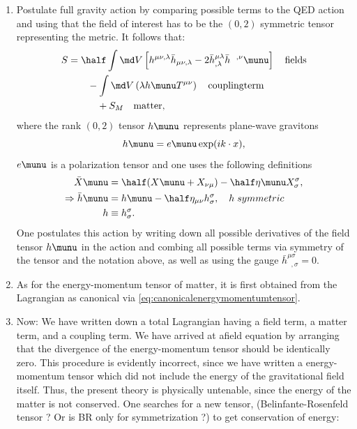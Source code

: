\begin{enumerate}
	\item Postulate full gravity action by comparing possible terms to the QED action and using that the field of interest has to be the $(0,2)$ symmetric tensor representing the metric. It follows that:
	\begin{align}
		S &= \half \int \md V\left[h^{\mu \nu, \lambda} \bar{h}_{\mu \nu, \lambda} - 2 \bar{h}^{\mu \lambda}_{,\lambda} \bar{h}^{\;\;\,,\nu}\munu \right] \quad \mathrm{fields} \nonumber \\
		& \qquad - \int \md V \left(\lambda h\munu T^{\mu \nu}\right) \quad \mathrm{coupling term} \nonumber \\
		&\qquad \quad + S_M \quad \mathrm{matter},
	\end{align}
where the rank $(0,2)$ tensor $h\munu$ represents plane-wave gravitons 
\begin{equation}
	h\munu = e\munu \exp(i k \cdot x),
\end{equation}
$e\munu$ is a polarization tensor and one uses the following definitions
\begin{align*}
	\bar{X}\munu &= \half (X\munu + X_{\nu \mu}) - \half \eta\munu X^\sigma_\sigma,\\
	\Rightarrow \bar{h}\munu &= h\munu - \half \eta_{\mu \nu} h^\sigma_\sigma, \quad h \; symmetric \\
	h&\equiv h^\sigma_\sigma.
\end{align*}
One postulates this action by writing down all possible derivatives of the field tensor $h\munu$ in the action and combing all possible terms via symmetry of the tensor and the notation above, as well as using the gauge $\bar{h}^{\mu \sigma}_{\;\; , \sigma}=0$.
\item As for the energy-momentum tensor of matter, it is first obtained from the Lagrangian as canonical via \ref{eq:canonicalenergymomentumtensor}. 
\item Now: We have written down a total Lagrangian having a field term, a matter term, and a coupling term. We have arrived at afield equation by arranging that the divergence of the energy-momentum tensor should be identically zero. This procedure is evidently incorrect, since we have written a energy-momentum tensor which did not include the energy of the gravitational field itself. Thus, the present theory is physically untenable, since the energy of the matter is not conserved. One searches for a new tensor, (Belinfante-Rosenfeld tensor ? Or is BR only for symmetrization ?) to get conservation of energy:

\end{enumerate}

